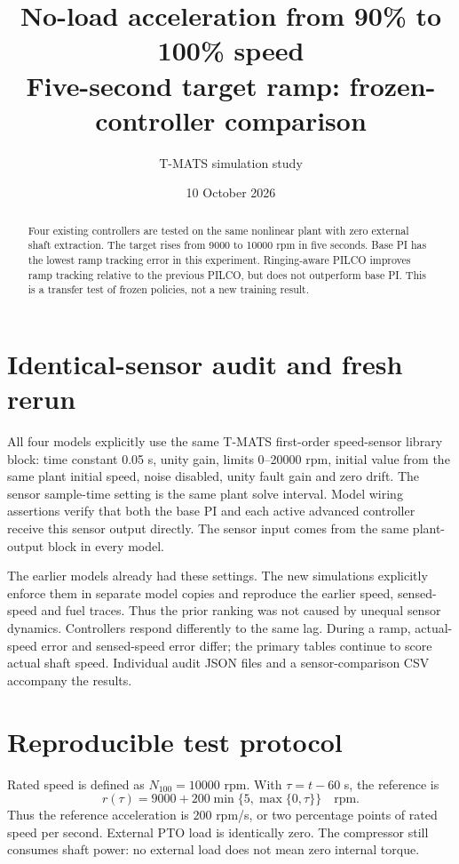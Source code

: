 \documentclass[11pt,a4paper]{article}
\title{No-load acceleration from 90\% to 100\% speed\\Five-second target ramp: frozen-controller comparison}
\author{T-MATS simulation study}\date{10 October 2026}
\begin{document}
\maketitle
\begin{abstract}Four existing controllers are tested on the same nonlinear plant with zero external shaft extraction. The target rises from 9000 to 10000 rpm in five seconds. Base PI has the lowest ramp tracking error in this experiment. Ringing-aware PILCO improves ramp tracking relative to the previous PILCO, but does not outperform base PI. This is a transfer test of frozen policies, not a new training result.\end{abstract}
\section{Identical-sensor audit and fresh rerun}
All four models explicitly use the same T-MATS first-order speed-sensor library block: time constant 0.05 s, unity gain, limits 0--20000 rpm, initial value from the same plant initial speed, noise disabled, unity fault gain and zero drift. The sensor sample-time setting is the same plant solve interval. Model wiring assertions verify that both the base PI and each active advanced controller receive this sensor output directly. The sensor input comes from the same plant-output block in every model.

The earlier models already had these settings. The new simulations explicitly enforce them in separate model copies and reproduce the earlier speed, sensed-speed and fuel traces. Thus the prior ranking was not caused by unequal sensor dynamics. Controllers respond differently to the same lag. During a ramp, actual-speed error and sensed-speed error differ; the primary tables continue to score actual shaft speed. Individual audit JSON files and a sensor-comparison CSV accompany the results.
\section{Reproducible test protocol}
Rated speed is defined as $N_{100}=10000$ rpm. With $\tau=t-60$ s, the reference is
\begin{equation}r(\tau)=9000+200\min\{5,\max\{0,\tau\}\}\quad\text{rpm}.\end{equation}
Thus the reference acceleration is $200$ rpm/s, or two percentage points of rated speed per second. External PTO load is identically zero. The compressor still consumes shaft power: no external load does not mean zero internal torque.
\end{document}
